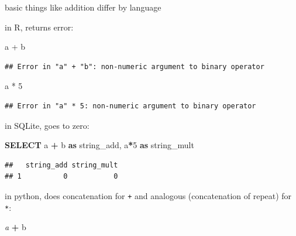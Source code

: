 \documentclass[
]{krantz}
\makeatletter
\newenvironment{Shaded}{\begin{snugshade}}{\end{snugshade}}
\newcommand{\CommentTok}[1]{\textcolor[rgb]{0.37,0.37,0.37}{\textit{#1}}}
\newcommand{\DecValTok}[1]{\textcolor[rgb]{0.06,0.06,0.06}{#1}}
\newcommand{\KeywordTok}[1]{\textcolor[rgb]{0.27,0.27,0.27}{\textbf{#1}}}
\newcommand{\NormalTok}[1]{#1}
\newcommand{\OperatorTok}[1]{\textcolor[rgb]{0.43,0.43,0.43}{\textbf{#1}}}
\newcommand{\SpecialCharTok}[1]{\textcolor[rgb]{0,0,0}{#1}}
\newcommand{\StringTok}[1]{\textcolor[rgb]{0.5,0.5,0.5}{#1}}
\newenvironment{kframe}{%
\medskip{}
\setlength{\fboxsep}{.8em}
 \def\at@end@of@kframe{}%
 \ifinner\ifhmode%
  \def\at@end@of@kframe{\end{minipage}}%
  \begin{minipage}{\columnwidth}%
 \fi\fi%
 \def\FrameCommand##1{\hskip\@totalleftmargin \hskip-\fboxsep
 \colorbox{shadecolor}{##1}\hskip-\fboxsep
     \hskip-\linewidth \hskip-\@totalleftmargin \hskip\columnwidth}%
 \MakeFramed {\advance\hsize-\width
   \@totalleftmargin\z@ \linewidth\hsize
   \@setminipage}}%
 {\par\unskip\endMakeFramed%
 \at@end@of@kframe}
\renewenvironment{Shaded}{\begin{kframe}}{\end{kframe}}
\makeatother
\begin{document}
basic things like addition differ by language

in R, returns error:

\begin{Shaded}
\begin{Highlighting}[]
\StringTok{\textquotesingle{}a\textquotesingle{}} \SpecialCharTok{+} \StringTok{\textquotesingle{}b\textquotesingle{}}
\end{Highlighting}
\end{Shaded}

\begin{verbatim}
## Error in "a" + "b": non-numeric argument to binary operator
\end{verbatim}

\begin{Shaded}
\begin{Highlighting}[]
\StringTok{\textquotesingle{}a\textquotesingle{}} \SpecialCharTok{*} \DecValTok{5}
\end{Highlighting}
\end{Shaded}

\begin{verbatim}
## Error in "a" * 5: non-numeric argument to binary operator
\end{verbatim}

in SQLite, goes to zero:

\begin{Shaded}
\begin{Highlighting}[]
\KeywordTok{SELECT}
  \StringTok{\textquotesingle{}a\textquotesingle{}} \OperatorTok{+} \StringTok{\textquotesingle{}b\textquotesingle{}} \KeywordTok{as}\NormalTok{ string\_add,}
  \StringTok{\textquotesingle{}a\textquotesingle{}}\OperatorTok{*}\DecValTok{5} \KeywordTok{as}\NormalTok{ string\_mult}
\end{Highlighting}
\end{Shaded}

\begin{verbatim}
##   string_add string_mult
## 1          0           0
\end{verbatim}

in python, does concatenation for \texttt{+} and analogous (concatenation of repeat) for \texttt{*}:

\begin{Shaded}
\begin{Highlighting}[]
\CommentTok{\textquotesingle{}a\textquotesingle{}} \OperatorTok{+} \StringTok{\textquotesingle{}b\textquotesingle{}}
\end{Highlighting}
\end{Shaded}
\end{document}
